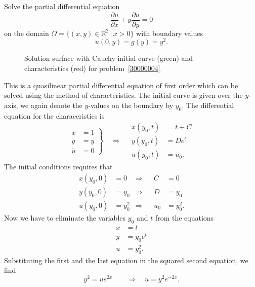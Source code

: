 Solve the partial differential equation
\[
\frac{\partial u}{\partial x}+y\frac{\partial u}{\partial y}=0
\]
on the domain
$\Omega=\{(x,y)\in\mathbb R^2\,|\, x> 0\}$ with boundary values
\[
u(0,y)=g(y)=y^2.
\]

\begin{loesung}
\begin{figure}
\centering
{}
\caption{Solution surface with Cauchy initial curve (green) and
characteristics (red) for problem~\ref{30000004}
\label{30000004:solutionfigure}}
\end{figure}
This is a quasilinear partial differential equation of first order
which can be solved using the method of characteristics.
The initial curve is given over the $y$-axis, we again denote the
$y$-values on the boundary by $y_0$.
The differential equation for the characeristics is
\[
\left.
\begin{aligned}
\dot x&=1\\
\dot y&=y\\
\dot u&=0
\end{aligned}
\right\}\quad\Rightarrow\quad
\begin{aligned}
x(y_0,t)&=t+C\\
y(y_0,t)&=De^t\\
u(y_0,t)&=u_0.
\end{aligned}
\]
The initial conditions requires that
\begin{align*}
x(y_0,0)&=0&\Rightarrow&&C&=0\\
y(y_0,0)&=y_0&\Rightarrow&&D&=y_0\\
u(y_0,0)&=y_0^2&\Rightarrow&&u_0&=y_0^2.
\end{align*}
Now we have to eliminate the variables $y_0$ and $t$ from the equations
\begin{align*}
x&=t\\
y&=y_0e^t\\
u&=y_0^2.
\end{align*}
Substituting the first and the last equation in the squared second
equation, we find
\[
y^2=ue^{2x}\qquad\Rightarrow\quad u=y^2e^{-2x}.
\]


\end{loesung}
